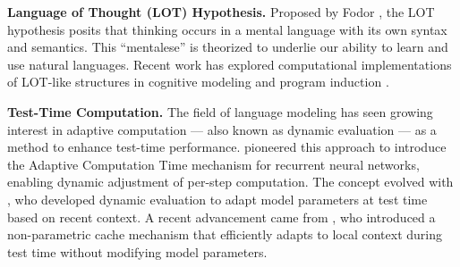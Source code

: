 {\bf Language of Thought (LOT) Hypothesis.}  Proposed by Fodor \cite{fodor1975language}, the LOT hypothesis posits that thinking occurs in a mental language with its own syntax and semantics. This ``mentalese'' is theorized to underlie our ability to learn and use natural languages. Recent work has explored computational implementations of LOT-like structures in cognitive modeling \cite{piantadosi2011learning} and program induction \cite{lake2015human}.

{\bf Test-Time Computation.} The field of language modeling has seen growing interest in adaptive computation --- also known as dynamic evaluation --- as a method to enhance test-time performance. \citet{graves2016adaptive} pioneered this approach to introduce the Adaptive Computation Time mechanism for recurrent neural networks, enabling dynamic adjustment of per-step computation. The concept evolved with \citet{krause2018dynamic}, who developed dynamic evaluation to adapt model parameters at test time based on recent context. A recent advancement came from \citet{Kasai2022DeepSF}, who introduced a non-parametric cache mechanism that efficiently adapts to local context during test time without modifying model parameters.